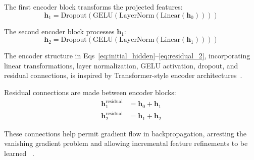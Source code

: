 \documentclass[10pt,letterpaper]{article}
\begin{document}
                                                                         The first encoder block transforms the projected features:
                                                                         \begin{equation}
                                                                             \mathbf{h}_1 = \text{Dropout}\left(\text{GELU}\left(\text{LayerNorm}\left(\text{Linear}(\mathbf{h}_0)\right)\right)\right)
                                                                             \end{equation}

                                                                             The second encoder block processes $\mathbf{h}_1$:
                                                                             \begin{equation}
                                                                                 \mathbf{h}_2 = \text{Dropout}\left(\text{GELU}\left(\text{LayerNorm}\left(\text{Linear}(\mathbf{h}_1)\right)\right)\right)
                                                                                 \end{equation}

                                                                                 The encoder structure in Eqs~\ref{eq:initial_hidden}--\ref{eq:residual_2}, incorporating linear transformations, layer normalization, GELU activation, dropout, and residual connections, is inspired by Transformer-style encoder architectures~\cite{ref50}.

                                                                                 Residual connections are made between encoder blocks:
                                                                                 \begin{align}
                                                                                     \mathbf{h}_1^{\text{residual}} &= \mathbf{h}_0 + \mathbf{h}_1 \\
                                                                                         \mathbf{h}_2^{\text{residual}} &= \mathbf{h}_1 + \mathbf{h}_2
                                                                                         \label{eq:residual_2}
                                                                                         \end{align}

                                                                                         These connections help permit gradient flow in backpropagation, arresting the vanishing gradient problem and allowing incremental feature refinements to be learned ~\cite{ref50}.
\end{document}
